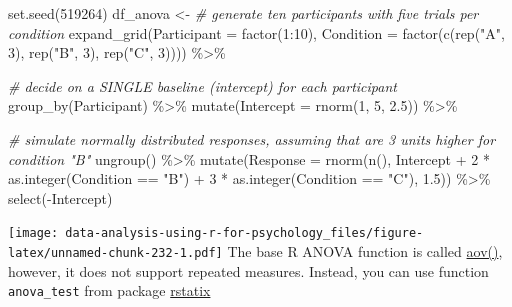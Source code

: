 \documentclass[
]{book}
\newenvironment{Shaded}{\begin{snugshade}}{\end{snugshade}}
\newcommand{\AttributeTok}[1]{\textcolor[rgb]{0.77,0.63,0.00}{#1}}
\newcommand{\CommentTok}[1]{\textcolor[rgb]{0.56,0.35,0.01}{\textit{#1}}}
\newcommand{\DecValTok}[1]{\textcolor[rgb]{0.00,0.00,0.81}{#1}}
\newcommand{\FloatTok}[1]{\textcolor[rgb]{0.00,0.00,0.81}{#1}}
\newcommand{\FunctionTok}[1]{\textcolor[rgb]{0.00,0.00,0.00}{#1}}
\newcommand{\NormalTok}[1]{#1}
\newcommand{\OtherTok}[1]{\textcolor[rgb]{0.56,0.35,0.01}{#1}}
\newcommand{\SpecialCharTok}[1]{\textcolor[rgb]{0.00,0.00,0.00}{#1}}
\newcommand{\StringTok}[1]{\textcolor[rgb]{0.31,0.60,0.02}{#1}}
\begin{document}
\begin{Shaded}
\begin{Highlighting}[]
\FunctionTok{set.seed}\NormalTok{(}\DecValTok{519264}\NormalTok{)}
\NormalTok{df\_anova }\OtherTok{\textless{}{-}}
  \CommentTok{\# generate ten participants with five trials per condition}
  \FunctionTok{expand\_grid}\NormalTok{(}\AttributeTok{Participant  =} \FunctionTok{factor}\NormalTok{(}\DecValTok{1}\SpecialCharTok{:}\DecValTok{10}\NormalTok{),}
              \AttributeTok{Condition =} \FunctionTok{factor}\NormalTok{(}\FunctionTok{c}\NormalTok{(}\FunctionTok{rep}\NormalTok{(}\StringTok{"A"}\NormalTok{, }\DecValTok{3}\NormalTok{), }\FunctionTok{rep}\NormalTok{(}\StringTok{"B"}\NormalTok{, }\DecValTok{3}\NormalTok{), }\FunctionTok{rep}\NormalTok{(}\StringTok{"C"}\NormalTok{, }\DecValTok{3}\NormalTok{)))) }\SpecialCharTok{\%\textgreater{}\%}
  
  \CommentTok{\# decide on a SINGLE baseline (intercept) for each participant}
  \FunctionTok{group\_by}\NormalTok{(Participant) }\SpecialCharTok{\%\textgreater{}\%}
  \FunctionTok{mutate}\NormalTok{(}\AttributeTok{Intercept =} \FunctionTok{rnorm}\NormalTok{(}\DecValTok{1}\NormalTok{, }\DecValTok{5}\NormalTok{, }\FloatTok{2.5}\NormalTok{)) }\SpecialCharTok{\%\textgreater{}\%}
  
  \CommentTok{\# simulate normally distributed responses, assuming that are 3 units higher for condition "B"}
  \FunctionTok{ungroup}\NormalTok{() }\SpecialCharTok{\%\textgreater{}\%}
  \FunctionTok{mutate}\NormalTok{(}\AttributeTok{Response =} \FunctionTok{rnorm}\NormalTok{(}\FunctionTok{n}\NormalTok{(), Intercept }\SpecialCharTok{+} \DecValTok{2} \SpecialCharTok{*} \FunctionTok{as.integer}\NormalTok{(Condition }\SpecialCharTok{==} \StringTok{"B"}\NormalTok{) }\SpecialCharTok{+} \DecValTok{3} \SpecialCharTok{*} \FunctionTok{as.integer}\NormalTok{(Condition }\SpecialCharTok{==} \StringTok{"C"}\NormalTok{), }\FloatTok{1.5}\NormalTok{)) }\SpecialCharTok{\%\textgreater{}\%}
  \FunctionTok{select}\NormalTok{(}\SpecialCharTok{{-}}\NormalTok{Intercept)}
\end{Highlighting}
\end{Shaded}

\texttt{[image: data-analysis-using-r-for-psychology\_files/figure-latex/unnamed-chunk-232-1.pdf]}
The base R ANOVA function is called \href{https://stat.ethz.ch/R-manual/R-devel/library/stats/html/aov.html}{aov()}, however, it does not support repeated measures. Instead, you can use function \texttt{anova\_test} from package \href{https://github.com/kassambara/rstatix}{rstatix}
\end{document}
